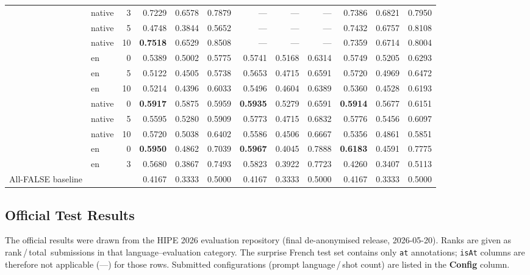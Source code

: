 \documentclass[
]{ceurart}
\theoremstyle{definition}
\begin{document}
\begin{table}[t]
\begin{tabular}{llr rrr rrr rrr}
 & native &  3 & 0.7229 & 0.6578 & 0.7879 & ---    & ---    & ---    & 0.7386 & 0.6821 & 0.7950 \\
 & native &  5 & 0.4748 & 0.3844 & 0.5652 & ---    & ---    & ---    & 0.7432 & 0.6757 & 0.8108 \\
 & native & 10 & \textbf{0.7518} & 0.6529 & 0.8508 & ---    & ---    & ---    & 0.7359 & 0.6714 & 0.8004 \\
\midrule
 & en     &  0 & 0.5389 & 0.5002 & 0.5775 & 0.5741 & 0.5168 & 0.6314 & 0.5749 & 0.5205 & 0.6293 \\
 & en     &  5 & 0.5122 & 0.4505 & 0.5738 & 0.5653 & 0.4715 & 0.6591 & 0.5720 & 0.4969 & 0.6472 \\
 & en     & 10 & 0.5214 & 0.4396 & 0.6033 & 0.5496 & 0.4604 & 0.6389 & 0.5360 & 0.4528 & 0.6193 \\
 & native &  0 & \textbf{0.5917} & 0.5875 & 0.5959 & \textbf{0.5935} & 0.5279 & 0.6591 & \textbf{0.5914} & 0.5677 & 0.6151 \\
 & native &  5 & 0.5595 & 0.5280 & 0.5909 & 0.5773 & 0.4715 & 0.6832 & 0.5776 & 0.5456 & 0.6097 \\
 & native & 10 & 0.5720 & 0.5038 & 0.6402 & 0.5586 & 0.4506 & 0.6667 & 0.5356 & 0.4861 & 0.5851 \\
\midrule
 & en     &  0 & \textbf{0.5950} & 0.4862 & 0.7039 & \textbf{0.5967} & 0.4045 & 0.7888 & \textbf{0.6183} & 0.4591 & 0.7775 \\
 & en     &  3 & 0.5680 & 0.3867 & 0.7493 & 0.5823 & 0.3922 & 0.7723 & 0.4260 & 0.3407 & 0.5113 \\
\midrule
All-FALSE baseline & & & 0.4167 & 0.3333 & 0.5000 & 0.4167 & 0.3333 & 0.5000 & 0.4167 & 0.3333 & 0.5000 \\
\bottomrule
\end{tabular}
\end{table}


\subsection{Official Test Results}
\label{app:test-results}

The official results were drawn from the HIPE 2026 evaluation repository (final de-anonymised release, 2026-05-20). Ranks are given as rank\,/\,total~submissions in that language--evaluation category. The surprise French test set contains only \texttt{at} annotations; \texttt{isAt} columns are therefore not applicable (---) for those rows. Submitted configurations (prompt language\,/\,shot count) are listed in the \textbf{Config} column.
\end{document}

